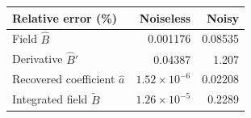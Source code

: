 \begin{tabular}{@{}lrr@{}}
\toprule
Relative error (\%) & Noiseless & Noisy \\
\midrule
Field $\widehat B$ & 0.001176 & 0.08535 \\
Derivative $\widehat B'$ & 0.04387 & 1.207 \\
Recovered coefficient $\widehat a$ & $1.52\times10^{-6}$ & 0.02208 \\
Integrated field $\widetilde B$ & $1.26\times10^{-5}$ & 0.2289 \\
\bottomrule
\end{tabular}
